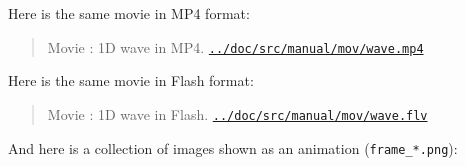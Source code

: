 \documentclass[%
oneside,                 %
final,                   %
10pt]{article}
\newenvironment{doconce:movie}{}{}
\newcounter{doconce:movie:counter}
\begin{document}
Here is the same movie in MP4 format:


\begin{doconce:movie}
\begin{quote}
Movie : 1D wave in MP4. \href{run:../doc/src/manual/mov/wave.mp4}{\nolinkurl{../doc/src/manual/mov/wave.mp4}}
\end{quote}
\end{doconce:movie}


Here is the same movie in Flash format:


\begin{doconce:movie}
\begin{quote}
Movie : 1D wave in Flash. \href{run:../doc/src/manual/mov/wave.flv}{\nolinkurl{../doc/src/manual/mov/wave.flv}}
\end{quote}
\end{doconce:movie}


And here is a collection of images shown as an animation
(\Verb!frame_*.png!):
\end{document}
